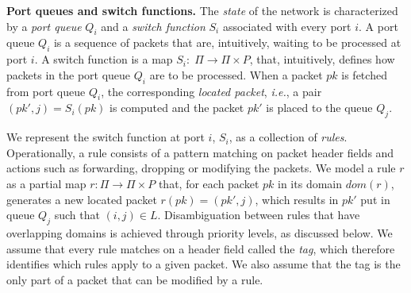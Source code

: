\documentclass[11pt,pdftex,letter]{article}
\newcommand{\dom}{\textit{dom}}
\newcommand{\ie}{{\it i.e.}}
\newcommand{\mcnote}[1]{\textcolor{heraldBlue}{\small \bf [MC: #1]}}
\newcommand{\mcnote}[1]{}
\begin{document}
\vspace{1mm}\noindent\textbf{Port queues and switch functions.}
The \emph{state} of the network is characterized by a \emph{port
  queue} $Q_i$ and a \emph{switch function} $S_i$ associated with
every port $i$.
A port queue $Q_i$ is a sequence of packets that are, intuitively, waiting to be processed at port $i$.
A switch function is a map $S_i:\;\Pi\rightarrow \Pi\times P$,
that, intuitively, defines how packets in
the port queue $Q_i$ are to be processed.
When a packet $\textit{pk}$ is fetched from port queue $Q_i$, the corresponding \emph{located
  packet}, \ie, a pair $(\textit{pk}',j)=S_i(\textit{pk})$ is computed
and the packet $\textit{pk}'$ is placed to the queue $Q_j$.

We represent the switch function at port $i$, $S_i$, as a collection of
\emph{rules}. Operationally, a rule consists of a pattern matching on packet
header fields and actions such as forwarding, dropping or modifying the
packets. We model a rule $r$ as a partial map $r:\Pi\rightarrow \Pi\times P$
that, for each packet $pk$ in its domain $\textit{dom}(r)$, generates a new
located packet $r(pk)=(pk',j)$, which results in $pk'$ put in queue $Q_j$ such
that $(i,j)\in L$. Disambiguation between rules that have overlapping domains
is achieved through priority levels, as discussed below. We assume that every
rule matches on a header field called the \emph{tag}, which therefore
identifies which rules apply to a given packet. We also assume that the tag is
the only part of a packet that can be modified by a rule.


%


\end{document}
